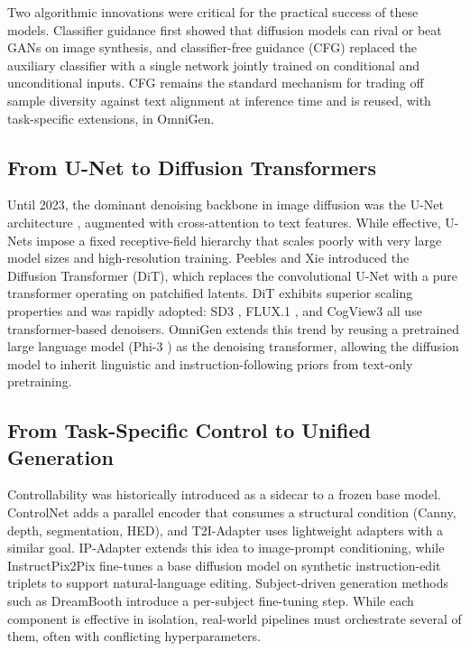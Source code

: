 \documentclass[conference]{IEEEtran}
\begin{document}
Two algorithmic innovations were critical for the practical success of these models. Classifier guidance \cite{dhariwal2021diffusion} first showed that diffusion models can rival or beat GANs on image synthesis, and classifier-free guidance (CFG) \cite{ho2021classifier} replaced the auxiliary classifier with a single network jointly trained on conditional and unconditional inputs. CFG remains the standard mechanism for trading off sample diversity against text alignment at inference time and is reused, with task-specific extensions, in OmniGen.

\subsection{From U-Net to Diffusion Transformers}
Until 2023, the dominant denoising backbone in image diffusion was the U-Net architecture \cite{ronneberger2015u}, augmented with cross-attention to text features. While effective, U-Nets impose a fixed receptive-field hierarchy that scales poorly with very large model sizes and high-resolution training. Peebles and Xie \cite{peebles2023scalable} introduced the Diffusion Transformer (DiT), which replaces the convolutional U-Net with a pure transformer operating on patchified latents. DiT exhibits superior scaling properties and was rapidly adopted: SD3 \cite{sd3}, FLUX.1 \cite{flux2024}, and CogView3 \cite{cogview3} all use transformer-based denoisers. OmniGen \cite{omnigen2024} extends this trend by reusing a pretrained large language model (Phi-3 \cite{phi3}) as the denoising transformer, allowing the diffusion model to inherit linguistic and instruction-following priors from text-only pretraining.

\subsection{From Task-Specific Control to Unified Generation}
Controllability was historically introduced as a sidecar to a frozen base model. ControlNet \cite{controlnet} adds a parallel encoder that consumes a structural condition (Canny, depth, segmentation, HED), and T2I-Adapter \cite{mou2024t2i} uses lightweight adapters with a similar goal. IP-Adapter \cite{ye2023ipadapter} extends this idea to image-prompt conditioning, while InstructPix2Pix \cite{brooks2023instructpix2pix} fine-tunes a base diffusion model on synthetic instruction-edit triplets to support natural-language editing. Subject-driven generation methods such as DreamBooth \cite{dreambench} introduce a per-subject fine-tuning step. While each component is effective in isolation, real-world pipelines must orchestrate several of them, often with conflicting hyperparameters.
\end{document}
